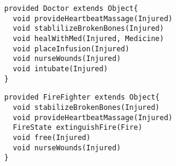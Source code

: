 \begin{lstlisting}[style = dsl, caption = Deklartion von Doctor, captionpos = b, label = lst_doctor]
provided Doctor extends Object{
  void provideHeartbeatMassage(Injured)
  void stablilizeBrokenBones(Injured)
  void healWithMed(Injured, Medicine)
  void placeInfusion(Injured)
  void nurseWounds(Injured)
  void intubate(Injured)
}
\end{lstlisting}
\begin{lstlisting}[style = dsl, caption = Deklartion von FireFighter, captionpos = b, label = lst_firefighter]
provided FireFighter extends Object{
  void stabilizeBrokenBones(Injured)
  void provideHeartbeatMassage(Injured)
  FireState extinguishFire(Fire)
  void free(Injured)
  void nurseWounds(Injured)
}
\end{lstlisting}